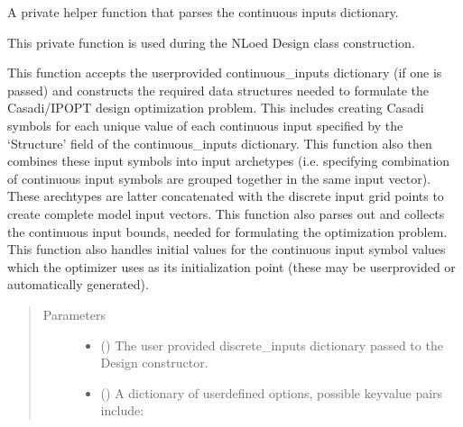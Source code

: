 \documentclass[letterpaper,10pt,english,openany,oneside]{sphinxmanual}
\begin{document}
\begin{fulllineitems}
\begin{fulllineitems}
\begin{quote}
\begin{description}
\end{description}\end{quote}

\end{fulllineitems}


\begin{fulllineitems}
\label{\detokenize{nloed:nloed.design.Design.__continuous_settup}}
A private helper function that parses the continuous inputs dictionary.

This private function is used during the NLoed Design class construction.

This function accepts the user\sphinxhyphen{}provided continuous\_inputs dictionary (if one is passed) and
constructs the required data structures needed to formulate the Casadi/IPOPT design optimization
problem. This includes creating Casadi symbols for each unique value of each continuous input
specified by the ‘Structure’ field of the continuous\_inputs dictionary. This function also
then combines these input symbols into input archetypes (i.e. specifying combination of continuous
input symbols are grouped together in the same input vector). These arechtypes are latter concatenated
with the discrete input grid points to create complete model input vectors. This function also
parses out and collects the continuous input bounds, needed for formulating the optimization
problem. This function also handles initial values for the continuous input symbol values
which the optimizer uses as its initialization point (these may be user\sphinxhyphen{}provided or automatically
generated).
\begin{quote}\begin{description}
\item[{Parameters}] \leavevmode\begin{itemize}
\item {} 
 () \textendash{} The user provided discrete\_inputs dictionary passed to the
Design constructor.

\item {} 
 (\sphinxstyleliteralemphasis{\sphinxupquote{, }}) \textendash{} A dictionary of user\sphinxhyphen{}defined options, possible key\sphinxhyphen{}value
pairs include:


\end{itemize}
\end{description}
\end{quote}
\end{fulllineitems}
\end{fulllineitems}
\end{document}
